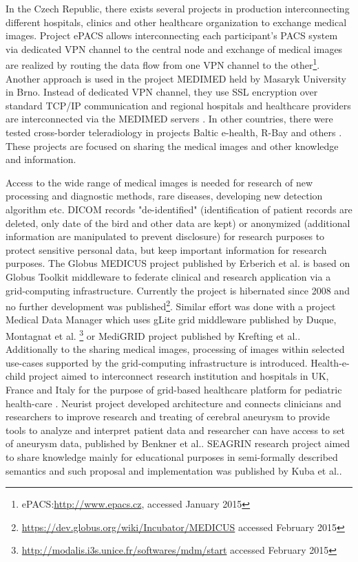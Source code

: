 In the Czech Republic, there exists several projects in production interconnecting different hospitals, clinics and other healthcare organization to exchange medical images. Project ePACS allows interconnecting each participant's PACS system via dedicated VPN channel to the central node and exchange of medical images are realized by routing the data flow from one VPN channel to the other\footnote{ePACS:\url{http://www.epacs.cz}, accessed January 2015}. Another approach is used in the project MEDIMED held by Masaryk University in Brno. Instead of dedicated VPN channel, they use  SSL encryption over standard TCP/IP communication and regional hospitals and healthcare providers are interconnected via the MEDIMED servers \cite{Slavicek2010}.%
In other countries, there were tested cross-border teleradiology in projects Baltic e-health, R-Bay and others \cite{Ross2010,Saliba2012}.
These projects are focused on sharing the medical images and other knowledge and information.

Access to the wide range of medical images is needed for research of new processing and diagnostic methods, rare diseases, developing new detection algorithm etc.  DICOM records "de-identified" (identification of patient records are deleted, only date of the bird and other data are kept) or anonymized (additional information are manipulated to prevent disclosure) for research purposes to protect sensitive personal data, but keep important information for research purposes. The Globus MEDICUS project published by Erberich et al.\cite{Erberich2006,Erberich2007} is based on Globus Toolkit middleware to federate clinical and research application via a grid-computing infrastructure. Currently the project is hibernated since 2008 and no further development was published\footnote{\url{https://dev.globus.org/wiki/Incubator/MEDICUS} accessed February 2015}. Similar effort was done with a project Medical Data Manager which uses gLite grid middleware published by Duque, Montagnat et al.\cite{Duque,Montagnat2007} \footnote{\url{http://modalis.i3s.unice.fr/softwares/mdm/start} accessed February 2015} or MediGRID project published by Krefting et al.\cite{Krefting2009, Krefting2010}. Additionally to the sharing medical images, processing of images within selected use-cases supported by the grid-computing infrastructure is introduced\cite{Krefting2010}. Health-e-child project aimed to interconnect research institution and hospitals in UK, France and Italy for the purpose of grid-based healthcare platform for pediatric health-care \cite{Skaburskas2008}. Neurist project developed architecture and connects clinicians and researchers to improve research and treating of cerebral aneurysm to provide tools to analyze and interpret patient data and researcher can have access to set of aneurysm data, published by Benkner et al.\cite{Benkner2010}.
SEAGRIN research project aimed to  share knowledge mainly for educational purposes in semi-formally described semantics and such proposal and implementation was published by Kuba et al.\cite{Kuba2006}. 

